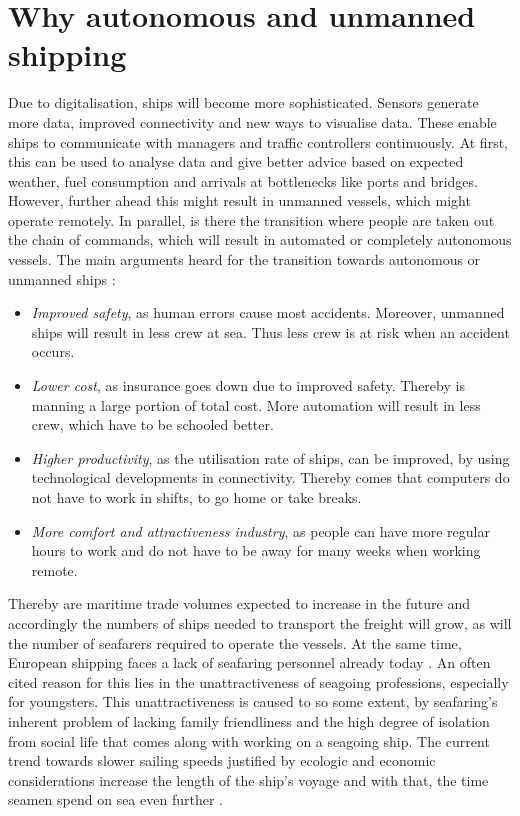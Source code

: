\section{Why autonomous and unmanned shipping}
Due to digitalisation, ships will become more sophisticated. Sensors generate more data, improved connectivity and new ways to visualise data. These enable ships to communicate with managers and traffic controllers continuously. At first, this can be used to analyse data and give better advice based on expected weather, fuel consumption and arrivals at bottlenecks like ports and bridges.
However, further ahead this might result in unmanned vessels, which might operate remotely. In parallel, is there the transition where people are taken out the chain of commands, which will result in automated or completely autonomous vessels. The main arguments heard for the transition towards autonomous or unmanned ships \cite{Saarni2018}:
\begin{itemize}
	\item \emph{Improved safety}, as human errors cause most accidents. Moreover, unmanned ships will result in less crew at sea. Thus less crew is at risk when an accident occurs.
	\item \emph{Lower cost}, as insurance goes down due to improved safety. Thereby is manning a large portion of total cost. More automation will result in less crew, which have to be schooled better.
	\item \emph{Higher productivity}, as the utilisation rate of ships, can be improved, by using technological developments in connectivity. Thereby comes that computers do not have to work in shifts, to go home or take breaks.
	\item \emph{More comfort and attractiveness industry}, as people can have more regular hours to work and do not have to be away for many weeks when working remote.
\end{itemize}
Thereby are maritime trade volumes expected to increase in the future and accordingly the numbers of ships needed to transport the freight will grow, as will the number of seafarers required to operate the vessels. At the same time, European shipping faces a lack of seafaring personnel already today \cite{Cahoon2014}. An often cited reason for this lies in the unattractiveness of seagoing professions, especially for youngsters. This unattractiveness is caused to so some extent, by seafaring’s inherent problem of lacking family friendliness and the high degree of isolation from social life that comes along with working on a seagoing ship. The current trend towards slower sailing speeds justified by ecologic and economic considerations increase the length of the ship’s voyage and with that, the time seamen spend on sea even further \cite{Finnsgard2018}.

